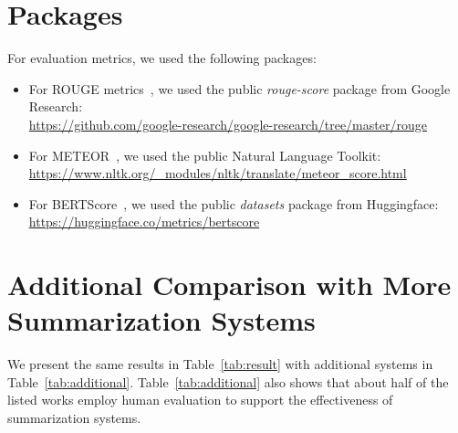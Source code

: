 \documentclass[11pt]{article}
\theoremstyle{remark}
\begin{document}
\appendix
\section{Packages}
For evaluation metrics, we used the following packages:
\begin{itemize}
    \item For ROUGE metrics~\cite{lin-hovy-2003-automatic}, we used the public \emph{rouge-score} package from Google Research: \\ \url{https://github.com/google-research/google-research/tree/master/rouge}
    \item For METEOR~\cite{lavie-agarwal-2007-meteor}, we used the public Natural Language Toolkit:\\
    \url{https://www.nltk.org/_modules/nltk/translate/meteor_score.html}
    \item For BERTScore~\cite{zhang2019bertscore}, we used the public \emph{datasets} package from Huggingface:\\
    \url{https://huggingface.co/metrics/bertscore}
\end{itemize}


\section{Additional Comparison with More Summarization Systems}
\label{sec:additional}
We present the same results in Table~\ref{tab:result} with additional systems in Table~\ref{tab:additional}. Table~\ref{tab:additional} also shows that about half of the listed works employ human evaluation to support the effectiveness of summarization systems.
\end{document}
